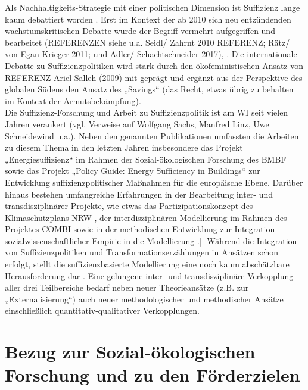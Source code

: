 \documentclass[a4paper,11pt,twoside]{scrartcl}
\begin{document}
Als Nachhaltigkeits-Strategie mit einer politischen Dimension ist Suffizienz lange kaum debattiert worden \cite{Winterfeld2002}. Erst im Kontext der ab 2010 sich neu entzündenden wachstumskritischen Debatte wurde der Begriff vermehrt aufgegriffen und bearbeitet (REFERENZEN siehe u.a. Seidl/ Zahrnt 2010 REFERENZ; Rätz/ von Egan-Krieger 2011; und Adler/ Schachtschneider 2017), \cite{Schneidewind2013,Winterfeld2017,Linz2015,Bierwirth2015,Thomas2015}. Die internationale Debatte zu Suffizienzpolitiken wird stark durch den ökofeministischen Ansatz von REFERENZ Ariel Salleh (2009) mit geprägt und ergänzt aus der Perspektive des globalen Südens den Ansatz des „Savings“ (das Recht, etwas übrig zu behalten im Kontext der Armutsbekämpfung).\\
Die Suffizienz-Forschung und Arbeit zu Suffizienzpolitik ist am WI seit vielen Jahren verankert (vgl. Verweise auf Wolfgang Sachs, Manfred Linz, Uwe Schneidewind u.a.).
Neben den genannten Publikationen umfassten die Arbeiten zu diesem Thema in den letzten Jahren insbesondere das Projekt „Energiesuffizienz“ \cite{Brischke2016} im Rahmen der Sozial-ökologischen Forschung des BMBF sowie das Projekt „Policy Guide: Energy Sufficiency in Buildings“ \cite{EnergySufficiencyProjekt} zur Entwicklung suffizienzpolitischer Maßnahmen für die europäische Ebene.
Darüber hinaus bestehen umfangreiche Erfahrungen in der Bearbeitung inter- und transdisziplinärer Projekte, wie etwas das Partizipationskonzept des Klimaschutzplans NRW \cite{Klimaschutzplan2011,Klimaschutzplan2012}, der interdisziplinären Modellierung im Rahmen des Projektes COMBI \cite{COMBI2015} sowie in der methodischen Entwicklung zur Integration sozialwissenschaftlicher Empirie in die Modellierung \cite{Bierwirth2016}.||
Während die Integration von Suffizienzpolitiken und Transformationserzählungen in Ansätzen schon erfolgt, stellt die suffizienzbasierte Modellierung eine noch kaum abschätzbare Herausforderung dar \cite{SAMADI2017}. Eine gelungene inter- und transdisziplinäre Verkopplung aller drei Teilbereiche bedarf neben neuer Theorieansätze (z.B. zur „Externalisierung“) auch neuer methodologischer und methodischer Ansätze einschließlich quantitativ-qualitativer Verkopplungen.

\section{Bezug zur Sozial-ökologischen Forschung und zu den Förderzielen}
\end{document}
